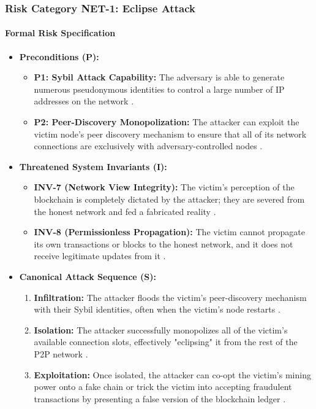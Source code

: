 \subsubsection{Risk Category NET-1: Eclipse Attack}

\paragraph{Formal Risk Specification}

\begin{itemize}
    \item \textbf{Preconditions (P):}
    \begin{itemize}
        \item \textbf{P1: Sybil Attack Capability:} The adversary is able to generate numerous pseudonymous identities to control a large number of IP addresses on the network \cite{wang2019}.
        \item \textbf{P2: Peer-Discovery Monopolization:} The attacker can exploit the victim node's peer discovery mechanism to ensure that all of its network connections are exclusively with adversary-controlled nodes \cite{wang2019}.
    \end{itemize}

    \item \textbf{Threatened System Invariants (I):}
    \begin{itemize}
        \item \textbf{INV-7 (Network View Integrity):} The victim's perception of the blockchain is completely dictated by the attacker; they are severed from the honest network and fed a fabricated reality \cite{wang2019}.
        \item \textbf{INV-8 (Permissionless Propagation):} The victim cannot propagate its own transactions or blocks to the honest network, and it does not receive legitimate updates from it \cite{wang2019}.
    \end{itemize}

    \item \textbf{Canonical Attack Sequence (S):}
    \begin{enumerate}
        \item \textbf{Infiltration:} The attacker floods the victim's peer-discovery mechanism with their Sybil identities, often when the victim's node restarts \cite{wang2019}.
        \item \textbf{Isolation:} The attacker successfully monopolizes all of the victim's available connection slots, effectively "eclipsing" it from the rest of the P2P network \cite{wang2019}.
        \item \textbf{Exploitation:} Once isolated, the attacker can co-opt the victim's mining power onto a fake chain or trick the victim into accepting fraudulent transactions by presenting a false version of the blockchain ledger \cite{wang2019, eyal2014}.
    \end{enumerate}
\end{itemize}

